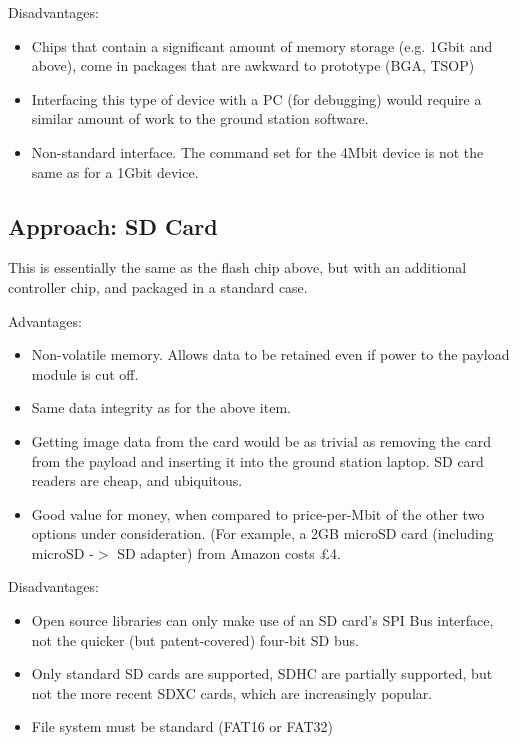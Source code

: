 Disadvantages:
\begin{itemize}
\item Chips that contain a significant amount of memory storage (e.g. 1Gbit 
and above), come in packages that are awkward to prototype (BGA, TSOP)
\item Interfacing this type of device with a PC (for debugging) would require a similar amount 
of work to the ground station software.
\item Non-standard interface. The command set for the 4Mbit device is not the 
same as for a 1Gbit device.
\end{itemize}



\subsection{Approach: SD Card}

This is essentially the same as the flash chip above, but with an additional controller chip, and packaged in a standard case.

Advantages:
\begin{itemize}
\item Non-volatile memory. Allows data to be retained even if power to the payload module is cut off.
\item Same data integrity as for the above item.
\item Getting image data from the card would be as trivial as removing the 
card from the payload and inserting it into the ground station laptop. SD card 
readers are cheap, and ubiquitous.
\item Good value for money, when compared to price-per-Mbit of the other two 
options under consideration. (For example, a 2GB microSD card (including 
microSD -$>$ SD adapter) from Amazon costs \pounds4.
\end{itemize}

Disadvantages:
\begin{itemize}
\item Open source libraries can only make use of an SD card's SPI Bus \cite{arduino_sd_library}
interface, not the quicker (but patent-covered) four-bit SD bus.
\item Only standard SD cards are supported, SDHC are partially supported, but not the more recent SDXC cards, which are increasingly popular.
\item File system must be standard (FAT16 or FAT32)
\end{itemize}

